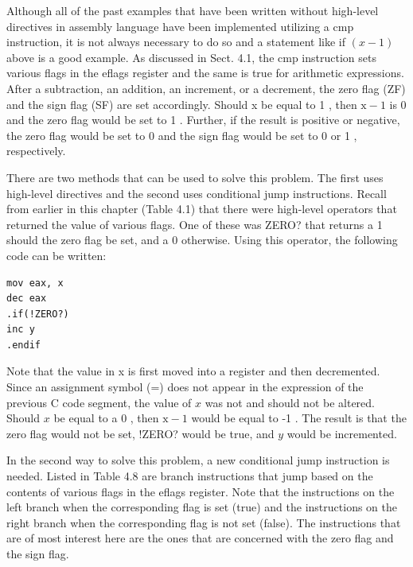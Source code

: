 \documentclass[10pt]{book}
\begin{document}
Although all of the past examples that have been written without high-level directives in assembly language have been implemented utilizing a cmp instruction, it is not always necessary to do so and a statement like if $(x-1)$ above is a good example. As discussed in Sect. 4.1, the cmp instruction sets various flags in the eflags register and the same is true for arithmetic expressions. After a subtraction, an addition, an increment, or a decrement, the zero flag (ZF) and the sign flag (SF) are set accordingly. Should x be equal to 1 , then $\mathrm{x}-1$ is 0 and the zero flag would be set to 1 . Further, if the result is positive or negative, the zero flag would be set to 0 and the sign flag would be set to 0 or 1 , respectively.

There are two methods that can be used to solve this problem. The first uses high-level directives and the second uses conditional jump instructions. Recall from earlier in this chapter (Table 4.1) that there were high-level operators that returned the value of various flags. One of these was ZERO? that returns a 1 should the zero flag be set, and a 0 otherwise. Using this operator, the following code can be written:

\begin{verbatim}
mov eax, x
dec eax
.if(!ZERO?)
inc y
.endif
\end{verbatim}

Note that the value in x is first moved into a register and then decremented. Since an assignment symbol (=) does not appear in the expression of the previous C code segment, the value of $x$ was not and should not be altered. Should $x$ be equal to a 0 , then $\mathrm{x}-1$ would be equal to -1 . The result is that the zero flag would not be set, !ZERO? would be true, and $y$ would be incremented.

In the second way to solve this problem, a new conditional jump instruction is needed. Listed in Table 4.8 are branch instructions that jump based on the contents of various flags in the eflags register. Note that the instructions on the left branch when the corresponding flag is set (true) and the instructions on the right branch when the corresponding flag is not set (false). The instructions that are of most interest here are the ones that are concerned with the zero flag and the sign flag.
\end{document}

